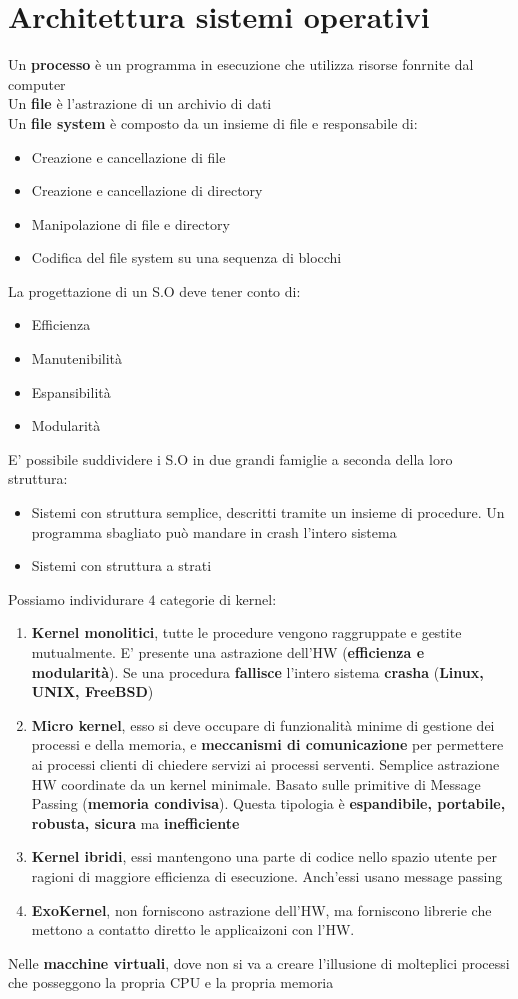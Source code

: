 \documentclass{article}
\begin{document}
\section{Architettura sistemi operativi}
Un \textbf{processo} è un programma in esecuzione che utilizza risorse fonrnite dal computer\\
Un \textbf{file} è l'astrazione di un archivio di dati\\
Un \textbf{file system} è composto da un insieme di file e responsabile di:
\begin{itemize}
  \item Creazione e cancellazione di file
  \item Creazione e cancellazione di directory
  \item Manipolazione di file e directory
  \item Codifica del file system su una sequenza di blocchi
\end{itemize}
La progettazione di un S.O deve tener conto di:
\begin{itemize}
  \item Efficienza 
  \item Manutenibilità
  \item Espansibilità
  \item Modularità
\end{itemize}
E' possibile suddividere i S.O in due grandi famiglie a seconda della loro struttura:
\begin{itemize}
  \item Sistemi con struttura semplice, descritti tramite un insieme di procedure. Un programma sbagliato può mandare in crash l'intero sistema
  \item Sistemi con struttura a strati
\end{itemize}
Possiamo individurare $4$ categorie di kernel:
\begin{enumerate}
  \item \textbf{Kernel monolitici}, tutte le procedure vengono raggruppate e gestite mutualmente. E' presente una astrazione dell'HW (\textbf{efficienza e modularità}). Se una procedura \textbf{fallisce} l'intero sistema \textbf{crasha} (\textbf{Linux, UNIX, FreeBSD})
  \item \textbf{Micro kernel}, esso si deve occupare di funzionalità minime di gestione dei processi e della memoria, e \textbf{meccanismi di comunicazione} per permettere ai processi clienti di chiedere servizi ai processi serventi. Semplice astrazione HW coordinate da un kernel minimale. Basato sulle primitive di Message Passing (\textbf{memoria condivisa}). Questa tipologia è \textbf{espandibile, portabile, robusta, sicura} ma \textbf{inefficiente}
  \item \textbf{Kernel ibridi}, essi mantengono una parte di codice nello spazio utente per ragioni di maggiore efficienza di esecuzione. Anch'essi usano message passing 
  \item \textbf{ExoKernel}, non forniscono astrazione dell'HW, ma forniscono librerie che mettono a contatto diretto le applicaizoni con l'HW.
\end{enumerate}
Nelle \textbf{macchine virtuali}, dove non si va a creare l'illusione di molteplici processi che posseggono la propria CPU e la propria memoria
\end{document}
